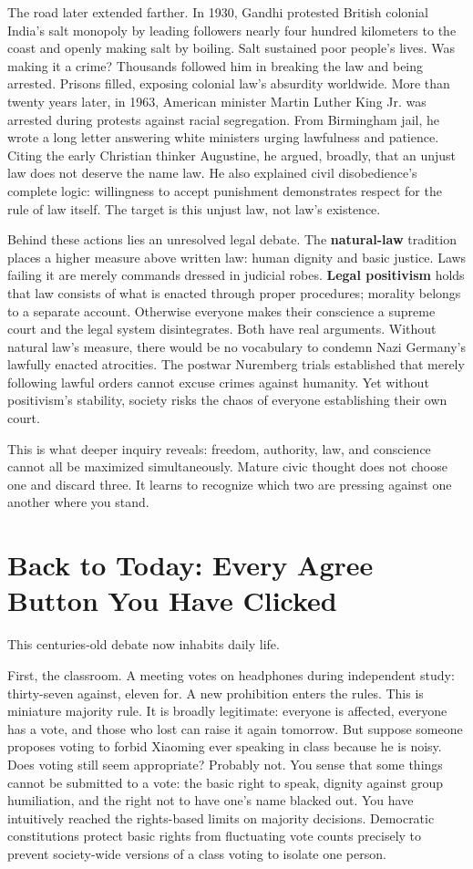 The road later extended farther. In 1930, Gandhi protested British colonial India's salt monopoly by leading followers nearly four hundred kilometers to the coast and openly making salt by boiling. Salt sustained poor people's lives. Was making it a crime? Thousands followed him in breaking the law and being arrested. Prisons filled, exposing colonial law's absurdity worldwide. More than twenty years later, in 1963, American minister Martin Luther King Jr. was arrested during protests against racial segregation. From Birmingham jail, he wrote a long letter answering white ministers urging lawfulness and patience. Citing the early Christian thinker Augustine, he argued, broadly, that an unjust law does not deserve the name law. He also explained civil disobedience's complete logic: willingness to accept punishment demonstrates respect for the rule of law itself. The target is this unjust law, not law's existence.

Behind these actions lies an unresolved legal debate. The \textbf{natural-law} tradition places a higher measure above written law: human dignity and basic justice. Laws failing it are merely commands dressed in judicial robes. \textbf{Legal positivism} holds that law consists of what is enacted through proper procedures; morality belongs to a separate account. Otherwise everyone makes their conscience a supreme court and the legal system disintegrates. Both have real arguments. Without natural law's measure, there would be no vocabulary to condemn Nazi Germany's lawfully enacted atrocities. The postwar Nuremberg trials established that merely following lawful orders cannot excuse crimes against humanity. Yet without positivism's stability, society risks the chaos of everyone establishing their own court.

This is what deeper inquiry reveals: freedom, authority, law, and conscience cannot all be maximized simultaneously. Mature civic thought does not choose one and discard three. It learns to recognize which two are pressing against one another where you stand.

\section[Every Agree Button You Have Clicked]{Back to Today: Every Agree Button You Have Clicked}
This centuries-old debate now inhabits daily life.

First, the classroom. A meeting votes on headphones during independent study: thirty-seven against, eleven for. A new prohibition enters the rules. This is miniature majority rule. It is broadly legitimate: everyone is affected, everyone has a vote, and those who lost can raise it again tomorrow. But suppose someone proposes voting to forbid Xiaoming ever speaking in class because he is noisy. Does voting still seem appropriate? Probably not. You sense that some things cannot be submitted to a vote: the basic right to speak, dignity against group humiliation, and the right not to have one's name blacked out. You have intuitively reached the rights-based limits on majority decisions. Democratic constitutions protect basic rights from fluctuating vote counts precisely to prevent society-wide versions of a class voting to isolate one person.

